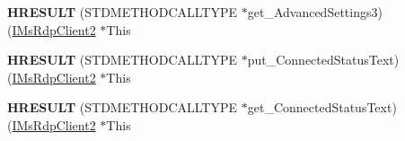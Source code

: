\begin{DoxyCompactItemize}
\item 
\mbox{\label{struct_m_s_t_s_c_lib_1_1_i_ms_rdp_client2_vtbl_a4fc2aefb6db70209dbf75c354db014a6}} 
{\bfseries H\+R\+E\+S\+U\+LT} (S\+T\+D\+M\+E\+T\+H\+O\+D\+C\+A\+L\+L\+T\+Y\+PE $\ast$get\+\_\+\+Advanced\+Settings3)(\hyperlink{interface_m_s_t_s_c_lib_1_1_i_ms_rdp_client2}{I\+Ms\+Rdp\+Client2} $\ast$This
\item 
\mbox{\label{struct_m_s_t_s_c_lib_1_1_i_ms_rdp_client2_vtbl_a85b2744a47d42ed8bf00825115ce1b40}} 
{\bfseries H\+R\+E\+S\+U\+LT} (S\+T\+D\+M\+E\+T\+H\+O\+D\+C\+A\+L\+L\+T\+Y\+PE $\ast$put\+\_\+\+Connected\+Status\+Text)(\hyperlink{interface_m_s_t_s_c_lib_1_1_i_ms_rdp_client2}{I\+Ms\+Rdp\+Client2} $\ast$This
\item 
\mbox{\label{struct_m_s_t_s_c_lib_1_1_i_ms_rdp_client2_vtbl_a1ab1c2bd6b58d7f0076db6c45c7f4797}} 
{\bfseries H\+R\+E\+S\+U\+LT} (S\+T\+D\+M\+E\+T\+H\+O\+D\+C\+A\+L\+L\+T\+Y\+PE $\ast$get\+\_\+\+Connected\+Status\+Text)(\hyperlink{interface_m_s_t_s_c_lib_1_1_i_ms_rdp_client2}{I\+Ms\+Rdp\+Client2} $\ast$This
\end{DoxyCompactItemize}
